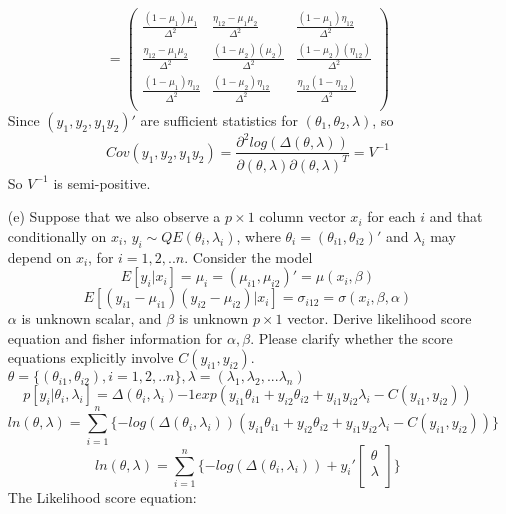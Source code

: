 \documentclass{homework}
\begin{document}
\begin{itemize}
\[      = \begin{pmatrix}
  \frac{(1-\mu_1)\mu_1}{\Delta^2} & \frac{\eta_{12}-\mu_1\mu_2}{\Delta^2} & \frac{(1-\mu_1)\eta_{12}}{\Delta^2} \\ 
  \frac{\eta_{12}-\mu_1\mu_2}{\Delta^2} & \frac{(1-\mu_2)(\mu_2)}{\Delta^2} & \frac{(1-\mu_2)(\eta_{12})}{\Delta^2} \\
  \frac{(1-\mu_1)\eta_{12}}{\Delta^2} & \frac{(1-\mu_2)\eta_{12}}{\Delta^2} & \frac{\eta_{12}(1-\eta_{12})}{\Delta^2}  \\
\end{pmatrix} 
    \]
    Since $(y_1, y_2, y_1y_2)'$ are sufficient statistics for $(\theta_1, \theta_2, \lambda)$, so 
   \[ 
    Cov(y_1, y_2, y_1y_2) = \frac{\partial^2 log(\Delta(\theta, \lambda))}{\partial(\theta,\lambda)\partial(\theta, \lambda)^T} = V^{-1}
    \]
    So $V^{-1}$ is semi-positive.
    \item[(e)] Suppose that we also observe a $p \times 1$ column vector $x_i$ for each $i$ and that conditionally on $x_i$, $y_i \sim QE(\theta_i, \lambda_i)$, where $\theta_i = (\theta_{i1}, \theta_{i2})'$ and $\lambda_i$ may depend on $x_i$, for $i=1,2,.. n$. Consider the model\\
   \[ 
    E[y_i|x_i] = \mu_i = (\mu_{i1}, \mu_{i2} )' = \mu(x_i, \beta)
    \]    
   \[ 
    E[(y_{i1}-\mu_{i1})(y_{i2}-\mu_{i2})|x_i] = \sigma_{i12} = \sigma(x_i, \beta, \alpha)
    \]     
    $\alpha$ is unknown scalar, and $\beta$ is unknown $p\times 1$ vector. Derive likelihood score equation and fisher information for $\alpha, \beta$. Please clarify whether the score equations explicitly involve $C(y_{i1}, y_{i2})$. \\
    $\theta = \{(\theta_{i1}, \theta_{i2}), i=1,2,.. n \}, \lambda = (\lambda_1, \lambda_2, ...\lambda_n)$\\
   \[ 
    p[y_{i}|\theta_i, \lambda_i] = \Delta(\theta_i, \lambda_i){-1} exp(y_{i1}\theta_{i1} + y_{i2}\theta_{i2} + y_{i1}y_{i2}\lambda_{i} - C(y_{i1},y_{i2}))
    \] 
   \[ 
    ln(\theta, \lambda) = \sum_{i=1}^{n} \{-log (\Delta(\theta_i, \lambda_i)) (y_{i1}\theta_{i1} + y_{i2}\theta_{i2} + y_{i1}y_{i2}\lambda_{i} - C(y_{i1},y_{i2})) \}
    \] 
   \[ 
   ln(\theta, \lambda) = \sum_{i=1}^{n} \{-log (\Delta(\theta_i, \lambda_i)) + y_i' \begin{bmatrix}
           \theta \\
           \lambda \\
         \end{bmatrix}\}
    \]  
    The Likelihood score equation:\\

\end{itemize}
\end{document}
